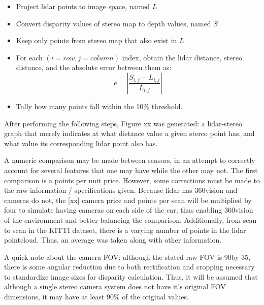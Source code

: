 \begin{itemize} \itemsep=-0.5em
    \item Project lidar points to image space, named $L$
    \item Convert disparity values of stereo map to depth values, named $S$
    \item Keep only points from stereo map that also exist in $L$
    \item For each $(i=row,j=column)$ index, obtain the lidar distance, stereo distance, and the absolute error between them as:
\begin{equation}
    e = \left | \frac{S_{i,j} - L_{i,j}}{L_{i,j}} \right |
    \label{eq_errCalc}
\end{equation}

    \item Tally how many points fall within the 10\% threshold.
\end{itemize}

After performing the following steps, Figure xx was generated: a lidar-stereo graph that merely indicates at what distance value a given stereo point has, and what value its corresponding lidar point also has. 


 




A numeric comparison may be made between sensors, in an attempt to correctly account for several features that one may have while the other may not. The first comparison is a points per unit price. However, some corrections must be made to the raw information / specifications given. Because lidar has 360\deg vision and cameras do not, the [xx] camera price and points per scan will be multiplied by four to simulate having cameras on each side of the car, thus enabling 360\deg vision of the environment and better balancing the comparison. Additionally, from scan to scan in the KITTI dataset, there is a varying number of points in the lidar pointcloud. Thus, an average was taken along with other information.


A quick note about the camera FOV: although the stated raw FOV is 90\deg by 35\deg, there is some angular reduction due to both rectification and cropping necessary to standardize image sizes for disparity calculation. Thus, it will be assumed that although a single stereo camera system does not have it's original FOV dimensions, it may have at least 90\% of the original values. 





